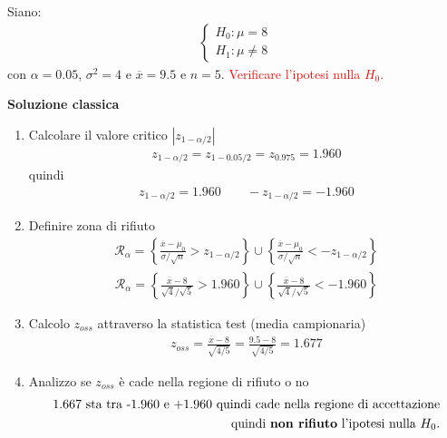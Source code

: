 \documentclass{article}  %
\theoremstyle{definition}
\begin{document}
\begin{esempio}
	Siano:
	\begin{align*}
		\begin{cases}
			H_0: \mu = 8 \\
			H_1: \mu \neq 8
		\end{cases}
	\end{align*}
	con $\alpha=0.05$, $\sigma^2=4$ e $\overline{x}=9.5$ e $n=5$. \textcolor{red}{Verificare l'ipotesi nulla $H_0$.}
	\begin{center}
		\textbf{Soluzione classica}
	\end{center}
	\begin{enumerate}
		\item Calcolare il valore critico $|z_{1-\alpha/2}|$
		      \begin{align*}
			      z_{1-\alpha/2}=z_{1-0.05/2}=z_{0.975}=1.960
		      \end{align*}
		      quindi
		      \begin{align*}
			      z_{1-\alpha/2}=1.960 \quad \quad -z_{1-\alpha/2}=-1.960
		      \end{align*}
		\item Definire zona di rifiuto
		      \begin{align*}
			      \mathcal{R}_{\alpha} = \left\{\frac{\overline{x}-\mu_0}{\sigma/\sqrt{n}} > z_{1-\alpha/2} \right\} \cup
			      \left\{\frac{\overline{x}-\mu_0}{\sigma/\sqrt{n}} < -z_{1-\alpha/2}\right\}
		      \end{align*}
		      \begin{align*}
			      \mathcal{R}_{\alpha} = \left\{\frac{\overline{x}-8}{\sqrt{4}/\sqrt{5}} > 1.960 \right\} \cup
			      \left\{\frac{\overline{x}-8}{\sqrt{4}/\sqrt{5}} < -1.960\right\}
		      \end{align*}
		\item Calcolo $z_{oss}$ attraverso la statistica test (media campionaria)
		      \begin{align*}
			      z_{oss} = \frac{\overline{x}-8}{\sqrt{4/5}} = \frac{9.5-8}{\sqrt{4/5}} = 1.677
		      \end{align*}
		\item Analizzo se $z_{oss}$ è cade nella regione di rifiuto o no
		      \begin{align*}
			      1.667 \text{ sta tra -1.960 e +1.960 quindi cade nella regione di accettazione} \\
			      \text{quindi \textbf{non rifiuto} l'ipotesi nulla } H_0.
		      \end{align*}

\end{enumerate}
\end{esempio}
\end{document}
